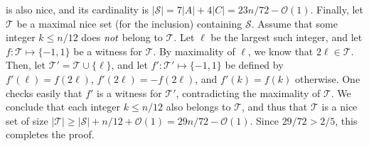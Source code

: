 is also nice, and its cardinality is $|\mathcal{S}| = 7 |A| + 4 |C| = 23n/ 72 - \mathcal{O}(1)$.
\nl
Finally, let $\mathcal{T}$ be a maximal nice set (for the inclusion) containing $\mathcal{S}$. Assume that some integer $k \leq n/12$ does $\emph{not}$ belong to $\mathcal{T}$. Let $\ell$ be the largest such integer, and let $f : \mathcal{T} \mapsto \{-1,1\}$ be a witness for $\mathcal{T}$. By maximality of $\ell$, we know that $2 \ell \in \mathcal{T}$. Then, let $\mathcal{T}' = \mathcal{T} \cup \{\ell\}$, and let $f' : \mathcal{T}' \mapsto \{-1,1\}$ be defined by $f'(\ell) = f(2\ell)$, $f'(2\ell) = -f(2\ell)$, and $f'(k) = f(k)$ otherwise. One checks easily that $f'$ is a witness for $\mathcal{T}'$, contradicting the maximality of $\mathcal{T}$.
\nl
We conclude that each integer $k \leq n/12$ also belongs to $\mathcal{T}$, and thus that $\mathcal{T}$ is a nice set of size $|\mathcal{T}| \geq |\mathcal{S}| + n / 12 + \mathcal{O}(1) = 29n/ 72 - \mathcal{O}(1)$. Since $29 / 72 > 2/5$, this completes the proof.

